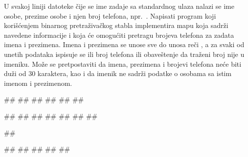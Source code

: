 \begin{Answer}[ref=702]
\end{Answer}


\begin{Exercise}[label=704]
U svakoj liniji datoteke čije se ime zadaje sa standardnog ulaza nalazi se ime osobe, prezime osobe i njen broj telefona, npr.~. Napisati program koji korišćenjem binarnog pretraživačkog stabla implementira mapu koja sadrži navedene informacije i koja će omogućiti pretragu brojeva telefona za zadata imena i prezimena. Imena i prezimena se unose sve do unosa reči , a za svaki od unetih podataka ispisuje se ili broj telefona ili obaveštenje da traženi broj nije u imeniku. Može se pretpostaviti da imena, prezimena i brojevi telefona neće biti duži od $30$ karaktera, kao i da imenik ne sadrži podatke o osobama sa istim imenom i prezimenom.

\begin{miditest}
\begin{upotreba}{1}
##  
##
##
##
##
##
          
#\naslovInt#
##
##	
##
##
##
##
\end{upotreba}
\end{miditest}
\begin{miditest}
\begin{upotreba}{2}
##
  
#\naslovInt#
##
##
##
##	
\end{upotreba}
\end{miditest}
\end{Exercise}

\begin{Answer}[ref=704]
\end{Answer}


